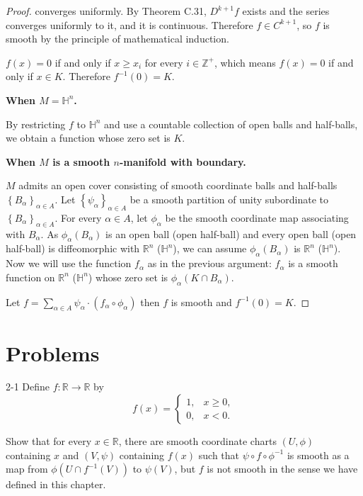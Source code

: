 \begin{proof}
    converges uniformly. By Theorem C.31, \( D^{k+1}f \) exists and the series converges uniformly to it, and it is continuous. Therefore \( f \in C^{k+1} \), so \( f \) is smooth by the principle of mathematical induction.

    \( f(x) = 0 \) if and only if \( x \ge x_{i} \) for every \( i \in \mathbb{Z}^{+} \), which means \( f(x) = 0 \) if and only if \( x \in K \). Therefore \( f^{-1}(0) = K \).

    \textbf{When \( M = \mathbb{H}^{n} \).}

    By restricting \( f \) to \( \mathbb{H}^{n} \) and use a countable collection of open balls and half-balls, we obtain a function whose zero set is \( K \).

    \textbf{When \( M \) is a smooth \(n\)-manifold with boundary.}

    \( M \) admits an open cover consisting of smooth coordinate balls and half-balls \( {\left\{ B_{\alpha} \right\}}_{\alpha \in A} \). Let \( {\left\{ \psi_{\alpha} \right\}}_{\alpha \in A} \) be a smooth partition of unity subordinate to \( {\left\{ B_{\alpha} \right\}}_{\alpha \in A} \). For every \( \alpha \in A \), let \( \phi_{\alpha} \) be the smooth coordinate map associating with \( B_{\alpha} \). As \( \phi_{\alpha}(B_{\alpha})  \) is an open ball (open half-ball) and every open ball (open half-ball) is diffeomorphic with \( \mathbb{R}^{n} \) (\(\mathbb{H}^{n}\)), we can assume \( \phi_{\alpha}(B_{\alpha}) \) is \( \mathbb{R}^{n} \) (\( \mathbb{H}^{n} \)). Now we will use the function \( f_{\alpha} \) as in the previous argument: \( f_{\alpha} \) is a smooth function on \( \mathbb{R}^{n} \) (\(\mathbb{H}^{n}\)) whose zero set is \( \phi_{\alpha}(K \cap B_{\alpha}) \).

    Let \( f = \sum_{\alpha \in A} \psi_{\alpha} \cdot (f_{\alpha} \circ \phi_{\alpha}) \) then \( f \) is smooth and \( f^{-1}(0) = K \).
\end{proof}

\section{Problems}

\begin{problem}{2-1}
    Define \( f: \mathbb{R} \to \mathbb{R} \) by
    \[
        f(x) = \begin{cases}
            1, & x \ge 0, \\
            0, & x < 0.
        \end{cases}
    \]

    Show that for every \( x \in \mathbb{R} \), there are smooth coordinate charts \( (U, \phi) \) containing \( x \) and \( (V, \psi) \) containing \( f(x) \) such that \( \psi \circ f \circ \phi^{-1} \) is smooth as a map from \( \phi(U \cap f^{-1}(V)) \) to \( \psi(V) \), but \( f \) is not smooth in the sense we have defined in this chapter.
\end{problem}

